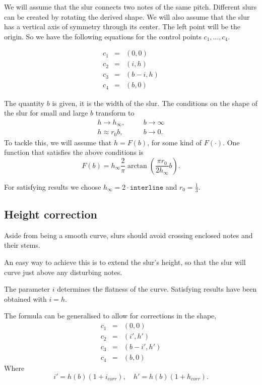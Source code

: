 \documentclass{article}
\def\kdots{,\ldots,}
\begin{document}
We will assume that the slur connects two notes of the same
pitch.  Different slurs can be created by rotating the derived shape.
We will also assume that the slur has a vertical axis of symmetry
through its center.  The left point will be the origin.     So we have
the following equations for the control points $c_1\kdots c_4$.

\begin{eqnarray*}
c_1&=& (0,0)\\
c_2&=& (i, h)\\
c_3&=& (b-i, h)\\
c_4&=& (b, 0)
\end{eqnarray*}

The quantity $b$ is given, it is the width of the slur.  The
conditions on the shape of the slur for small and large $b$ transform
to
\begin{eqnarray*}
 h \to h_{\infty} , &&\quad b \to \infty\\
 h \approx r_{0} b, &&\quad b \to 0.
\end{eqnarray*}
To tackle  this, we  will  assume that $h   = F(b)$, for  some kind of
$F(\cdot)$.  One function that satisfies the above conditions is
$$
F(b) = h_{\infty} \frac{2}{\pi} \arctan \left( \frac{\pi r_0}{2
h_{\infty}} b \right).
$$

For satisfying results we choose $h_{\infty} = 2\cdot \texttt{interline}$
and $r_0 = \frac 13$.

\subsection{Height correction}

Aside from being a smooth curve, slurs should avoid crossing
enclosed notes and their stems.

An easy way to achieve this is to extend the slur's height,
so that the slur will curve just above any disturbing notes.

The parameter $i$ determines the flatness of the curve.  Satisfying
results have been obtained with $i = h$.

The formula can be generalised to allow for corrections in the shape, 
\begin{eqnarray*}
c_1&=& (0,0)\\
c_2&=& (i', h')\\
c_3&=& (b-i', h')\\
c_4&=& (b, 0)
\end{eqnarray*}
Where
$$
i' = h(b) (1 + i_{corr}), \quad h' = h(b) (1 + h_{corr}).
$$
\end{document}
